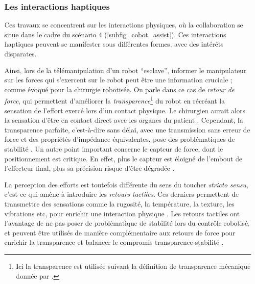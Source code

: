 \subsubsection{Les interactions haptiques}

Ces travaux se concentrent sur les interactions physiques, où la collaboration se situe dans le cadre du scénario 4 (\cref{subfig_cobot_assist}). Ces interactions haptiques peuvent se manifester sous différentes formes, avec des intérêts disparates. 

Ainsi, lors de la télémanipulation d'un robot \foreignquote{french}{esclave}, informer le manipulateur sur les forces qui s'exercent sur le robot peut être une information cruciale ; comme évoqué pour la chirurgie robotisée. On parle dans ce cas de \emph{retour de force}, qui permettent d'améliorer la \emph{transparence}\footnote{%
Ici la transparence est utilisée suivant la définition de transparence mécanique donnée par \parencite{alonso_system_2018}.} du robot en récréant la sensation de l'effort exercé lors d'un contact physique. Le chirurgien aurait alors la sensation d'être en contact direct avec les organes du patient \parencite{pacchierotti_improving_2014}. Cependant, la transparence parfaite, c'est-à-dire sans délai, avec une transmission sans erreur de force et des propriétés d'impédance équivalentes, pose des problématiques de stabilité \parencite{enayati_haptics_2016}. Un autre point important concerne le capteur de force, dont le positionnement est critique. En effet, plus le capteur est éloigné de l'embout de l'effecteur final, plus sa précision risque d'être dégradée \parencite{eppinger_dynamic_1986, tiwana_review_2012}.

La perception des efforts est toutefois différente du sens du toucher \textit{stricto sensu}, c'est ce qui amène à introduire les \emph{retours tactiles}. Ces derniers permettent de transmettre des sensations comme la rugosité, la température, la texture, les vibrations etc, pour enrichir une interaction physique \parencite{tiwana_review_2012, el_rassi_review_2020}. Les retours tactiles ont l'avantage de ne pas poser de problématique de stabilité lors du contrôle robotisé, et peuvent être utilisés de manière complémentaire aux retours de force pour enrichir la transparence et balancer le compromis transparence-stabilité \parencite{pacchierotti_cutaneous_2015, lim_role_2015}.

